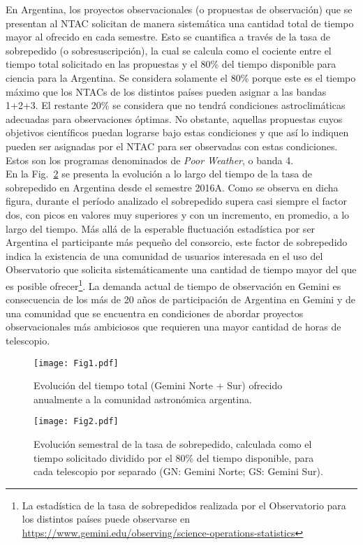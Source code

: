 \documentclass[baaa]{baaa}
\begin{document}
En Argentina, los proyectos observacionales (o propuestas de observación) que se presentan al NTAC solicitan de manera sistemática una cantidad total de tiempo mayor al ofrecido en cada semestre. Esto se cuantifica a través de la tasa de sobrepedido (o sobresuscripción), la cual se calcula como el cociente entre el tiempo total solicitado en las propuestas y el 80\% del tiempo disponible para ciencia para la Argentina. Se considera solamente el 80\% porque este es el tiempo máximo que los NTACs de los distintos países pueden asignar a las bandas 1+2+3. El restante 20\% se considera que no tendrá condiciones astroclimáticas adecuadas para observaciones óptimas. No obstante, aquellas propuestas cuyos objetivos científicos puedan lograrse bajo estas condiciones y que así lo indiquen pueden ser asignadas por el NTAC para ser observadas con estas condiciones. Estos son los programas denominados de {\em Poor Weather}, o banda 4.\\

En la Fig.~\ref{fig2} se presenta la evolución a lo largo del tiempo de la tasa de sobrepedido en Argentina desde el semestre 2016A. Como se observa en dicha figura, durante el período analizado el sobrepedido supera casi siempre el factor dos, con picos en valores muy superiores y con un incremento, en promedio, a lo largo del tiempo. Más allá de la esperable fluctuación estadística por ser Argentina el participante más pequeño del consorcio, este factor de sobrepedido indica la existencia de una comunidad de usuarios interesada en el uso del Observatorio que solicita sistemáticamente una cantidad de tiempo mayor del que es posible ofrecer\footnote{La estadística de la tasa de sobrepedidos realizada por el Observatorio para los distintos países puede observarse en \url{https://www.gemini.edu/observing/science-operations-statistics}}. La demanda actual de tiempo de observación en Gemini es consecuencia de los más de 20 años de participación de Argentina en Gemini y de una comunidad que se encuentra en condiciones de abordar proyectos observacionales más ambiciosos que requieren una mayor cantidad de horas de telescopio.


\begin{figure}[!t]
\centering
\texttt{[image: Fig1.pdf]}
\caption{Evolución del tiempo total (Gemini Norte + Sur) ofrecido anualmente a la comunidad astronómica argentina.}
\label{fig1}
\end{figure}

\begin{figure}[!t]
\centering
\texttt{[image: Fig2.pdf]}
\caption{Evolución semestral de la tasa de sobrepedido, calculada como el tiempo solicitado dividido por el 80\% del tiempo disponible, para cada telescopio por separado (GN: Gemini Norte; GS: Gemini Sur).}
\label{fig2}
\end{figure}
\end{document}
